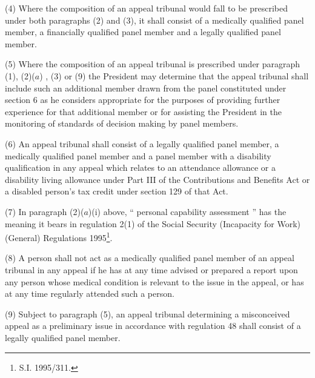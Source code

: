 \documentclass[12pt,a4paper]{article}
\begin{document}
(4) Where the composition of an appeal tribunal would fall to be prescribed under both paragraphs (2) and (3), it shall consist of a medically qualified panel member, a financially qualified panel member and a legally qualified panel member.

(5) Where the composition of an appeal tribunal is prescribed under 
paragraph (1), (2)($a$)%
    , (3) or (9)  %
the President may determine that the appeal tribunal shall include such an additional member drawn from the panel constituted under section 6 as he considers appropriate for the purposes of providing further experience for that additional member or for assisting the President in the monitoring of standards of decision making by panel members.

\enlargethispage{\baselineskip}

(6) An appeal tribunal shall consist of a legally qualified panel member, a medically qualified panel member and a panel member with a disability qualification in any appeal which relates to an attendance allowance or a disability living allowance under Part III of the Contributions and Benefits Act or 
a disabled person’s tax credit  %
under section 129 of that Act.

(7) In paragraph (2)($a$)(i) above, “%
personal capability assessment%
” has the meaning it bears in regulation 2(1) of the Social Security (Incapacity for Work) (General) Regulations 1995\footnote{\frenchspacing S.I. 1995/311.}.

(8) A person shall not act as a medically qualified panel member of an appeal tribunal in \pagebreak[3]
any appeal if he has at any time advised or prepared a report upon any person whose medical condition is relevant to the issue in the appeal, or has at any time regularly attended such a person.

(9) Subject to paragraph (5), an appeal tribunal determining a misconceived appeal as a preliminary issue in accordance with regulation 48 shall consist of a legally qualified panel member.

\end{document}
